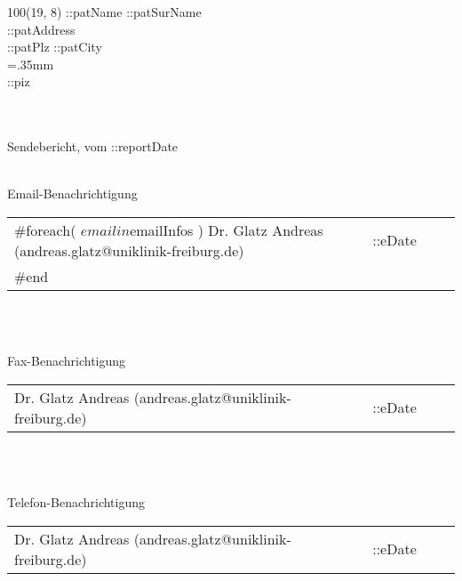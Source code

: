 \documentclass{scrreprt}
\begin{document}
%
 


\baselineskip10pt

\textblockorigin{0in}{0in}
\setlength{\TPHorizModule}{1mm}
\setlength{\TPVertModule}{1mm}


{
\scriptsize
\begin{textblock}{100}(19, 8) 
\noindent ::patName  ::patSurName\\
::patAddress\\
::patPlz ::patCity\\
\X=.35mm        
\barheight=1cm 
\\
::piz\\
\end{textblock}
}



\noindent\makebox[\linewidth]{\rule{\linewidth}{0.4pt}}\\\\
{\huge Sendebericht, vom ::reportDate} \\\\
{\normalsize Email-Benachrichtigung\\
	\begin{tabular}[t]{p{0.8\linewidth}p{0.2\linewidth}}
	#foreach( $email in $emailInfos )
		Dr. Glatz Andreas (andreas.glatz@uniklinik-freiburg.de) & ::eDate \\
	#end 
	\end{tabular}
}
\\\\
\noindent
{\normalsize Fax-Benachrichtigung\\
	\begin{tabular}[t]{p{0.8\linewidth}p{0.2\linewidth}}
	Dr. Glatz Andreas (andreas.glatz@uniklinik-freiburg.de) & ::eDate \\
	\end{tabular}
}
\\\\
\noindent
{\normalsize Telefon-Benachrichtigung\\
	\begin{tabular}[t]{p{0.8\linewidth}p{0.2\linewidth}}
	Dr. Glatz Andreas (andreas.glatz@uniklinik-freiburg.de) & ::eDate \\
	\end{tabular}
}

	
\end{document}
